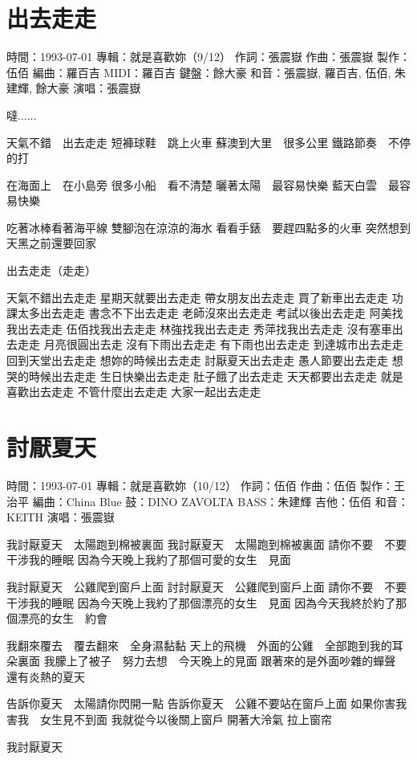 \documentclass[UTF8,a4paper,oneside,twocolumn,12pt]{ctexbook}
\newcommand{\infopair}[2]{\textbullet #1：#2}
\newcommand{\zc}[1][伍佰]{\infopair{作詞}{#1}}
\newcommand{\zq}[1][伍佰]{\infopair{作曲}{#1}}
\newcommand{\bq}[1][伍佰]{\infopair{編曲}{#1}}
\newcommand{\zj}[1]{\infopair{專輯}{#1}}
\newcommand{\zz}[1]{\infopair{製作}{#1}}
\newcommand{\sj}[1]{\infopair{時間}{#1}}
\newenvironment{info}{\begin{flushleft}\kaishu
	}
	{\end{flushleft}\normalsize\yahei\par}
\newenvironment{lyric}{
	}
{}
\begin{document}
\section{出去走走}
\begin{info}
	\sj{1993-07-01}
	\zj{就是喜歡妳（9/12）}
	\zc[張震嶽]
	\zq[張震嶽]
	\zz{伍佰}
	\bq[羅百吉]
	\infopair{MIDI}{羅百吉}
	\infopair{鍵盤}{餘大豪}
	\infopair{和音}{張震嶽, 羅百吉, 伍佰, 朱建輝, 餘大豪}
	\infopair{演唱}{張震嶽}
\end{info}
\begin{lyric}
	噠......

	天氣不錯　出去走走
	短褲球鞋　跳上火車
	蘇澳到大里　很多公里
	鐵路節奏　不停的打

	在海面上　在小島旁
	很多小船　看不清楚
	曬著太陽　最容易快樂
	藍天白雲　最容易快樂

	吃著冰棒看著海平線
	雙腳泡在涼涼的海水
	看看手錶　要趕四點多的火車
	突然想到天黑之前還要回家

	出去走走（走走）

	天氣不錯出去走走 星期天就要出去走走
	帶女朋友出去走走 買了新車出去走走
	功課太多出去走走 書念不下出去走走
	老師沒來出去走走 考試以後出去走走
	阿美找我出去走走 伍佰找我出去走走
	林強找我出去走走 秀萍找我出去走走
	沒有塞車出去走走 月亮很圓出去走
	沒有下雨出去走走 有下雨也出去走走
	到達城市出去走走 回到天堂出去走走
	想妳的時候出去走走 討厭夏天出去走走
	愚人節要出去走走 想哭的時候出去走走
	生日快樂出去走走 肚子餓了出去走走
	天天都要出去走走 就是喜歡出去走走
	不管什麼出去走走 大家一起出去走走
\end{lyric}

\section{討厭夏天}
\begin{info}
	\sj{1993-07-01}
	\zj{就是喜歡妳（10/12）}
	\zc
	\zq
	\zz{王治平}
	\bq[China Blue]
	\infopair{鼓}{DINO ZAVOLTA}
	\infopair{BASS}{朱建輝}
	\infopair{吉他}{伍佰}
	\infopair{和音}{KEITH}
	\infopair{演唱}{張震嶽}
\end{info}
\begin{lyric}
	我討厭夏天　太陽跑到棉被裏面
	我討厭夏天　太陽跑到棉被裏面
	請你不要　不要　干涉我的睡眠
	因為今天晚上我約了那個可愛的女生　見面

	我討厭夏天　公雞爬到窗戶上面
	討討厭夏天　公雞爬到窗戶上面
	請你不要　不要　干涉我的睡眠
	因為今天晚上我約了那個漂亮的女生　見面
	因為今天我終於約了那個漂亮的女生　約會

	我翻來覆去　覆去翻來　全身濕黏黏
	天上的飛機　外面的公雞　全部跑到我的耳朵裏面
	我朦上了被子　努力去想　今天晚上的見面
	跟著來的是外面吵雜的蟬聲　還有炎熱的夏天

	告訴你夏天　太陽請你閃開一點
	告訴你夏天　公雞不要站在窗戶上面
	如果你害我　害我　女生見不到面
	我就從今以後關上窗戶
	開著大泠氣
	拉上窗帘

	我討厭夏天
\end{lyric}
\end{document}
